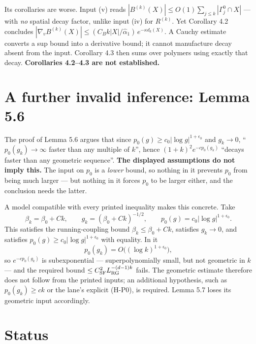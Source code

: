 \documentclass[11pt]{article}
\begin{document}
\begin{sloppypar}
Its corollaries are worse. Input (v) reads
$|B^{(k)}(X)|\le O(1)\sum_{j\le k}|\Gamma^0_j\cap X|$ --- with \emph{no} spatial decay
factor, unlike input (iv) for $R^{(k)}$. Yet Corollary 4.2 concludes
$|\nabla_vB^{(k)}(X)|\le(C_Bk|X|/\hat\alpha_1)\,e^{-\kappa d_k(X)}$. A Cauchy estimate
converts a sup bound into a derivative bound; it cannot manufacture decay absent from
the input. Corollary 4.3 then sums over polymers using exactly that decay.
\textbf{Corollaries 4.2--4.3 are not established.}
\end{sloppypar}

\section{A further invalid inference: Lemma 5.6}

The proof of Lemma 5.6 argues that since $p_0(g)\ge c_0|\log g|^{1+\epsilon_0}$ and
$g_k\to0$, ``$p_0(g_k)\to\infty$ faster than any multiple of $k$'', hence
$(1+k)^2e^{-cp_0(g_k)}$ ``decays faster than any geometric sequence''. \textbf{The
displayed assumptions do not imply this.} The input on $p_0$ is a \emph{lower} bound,
so nothing in it prevents $p_0$ from being much larger --- but nothing in it forces
$p_0$ to be larger either, and the conclusion needs the latter.

A model compatible with every printed inequality makes this concrete. Take
\[
\beta_k=\beta_0+Ck,\qquad g_k=(\beta_0+Ck)^{-1/2},\qquad
p_0(g)=c_0|\log g|^{1+\epsilon_0} .
\]
This satisfies the running-coupling bound $\beta_k\le\beta_0+Ck$, satisfies
$g_k\to0$, and satisfies $p_0(g)\ge c_0|\log g|^{1+\epsilon_0}$ with equality. In it
\[
p_0(g_k)=O\bigl((\log k)^{1+\epsilon_0}\bigr),
\]
so $e^{-cp_0(g_k)}$ is subexponential --- superpolynomially small, but not geometric
in $k$ --- and the required bound $\le C_{\rm SF}^2L_{\rm RG}^{-(d-1)k}$ fails. The
geometric estimate therefore does not follow from the printed inputs; an additional
hypothesis, such as $p_0(g_k)\ge ck$ or the lane's explicit (H-P0), is required.
Lemma 5.7 loses its geometric input accordingly.

\section{Status}
\end{document}
